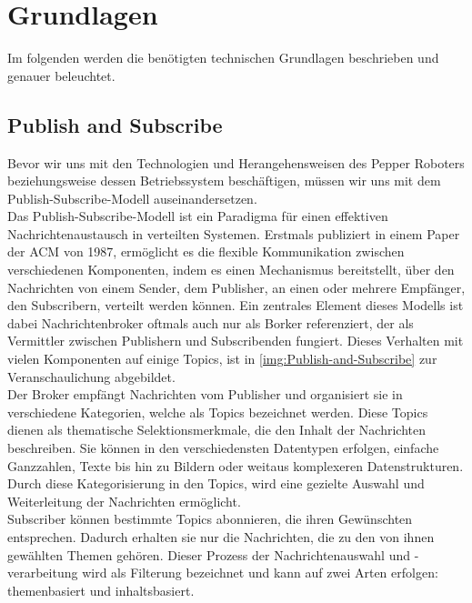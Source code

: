 \chapter{Grundlagen}\label{chap:Grundlagen}
Im folgenden werden die benötigten technischen Grundlagen beschrieben und genauer beleuchtet.

\section{Publish and Subscribe}\label{sec:PublishAndSubscribe}
Bevor wir uns mit den Technologien und Herangehensweisen des Pepper Roboters beziehungsweise dessen Betriebssystem beschäftigen, müssen wir uns mit dem Publish-Subscribe-Modell auseinandersetzen.
\\

\noindent
Das Publish-Subscribe-Modell ist ein Paradigma für einen effektiven Nachrichtenaustausch in verteilten Systemen. Erstmals publiziert in einem Paper der \ac{ACM} von 1987\cite{wiki_publish_subscribe_pattern}, ermöglicht es die flexible Kommunikation zwischen verschiedenen Komponenten, indem es einen Mechanismus bereitstellt, über den Nachrichten von einem Sender, dem Publisher, an einen oder mehrere Empfänger, den Subscribern, verteilt werden können. Ein zentrales Element dieses Modells ist dabei Nachrichtenbroker oftmals auch nur als Borker referenziert, der als Vermittler zwischen Publishern und Subscribenden fungiert. Dieses Verhalten mit vielen Komponenten auf einige Topics, ist in \autoref{img:Publish-and-Subscribe} zur Veranschaulichung abgebildet.\\
\noindent
Der Broker empfängt Nachrichten vom Publisher und organisiert sie in verschiedene Kategorien, welche als Topics bezeichnet werden. Diese Topics dienen als thematische Selektionsmerkmale, die den Inhalt der Nachrichten beschreiben. Sie können in den verschiedensten Datentypen erfolgen, einfache Ganzzahlen, Texte bis hin zu Bildern oder weitaus komplexeren Datenstrukturen. Durch diese Kategorisierung in den Topics, wird eine gezielte Auswahl und Weiterleitung der Nachrichten ermöglicht.
\\

\noindent
Subscriber können bestimmte Topics abonnieren, die ihren Gewünschten entsprechen. Dadurch erhalten sie nur die Nachrichten, die zu den von ihnen gewählten Themen gehören. Dieser Prozess der Nachrichtenauswahl und -verarbeitung wird als Filterung bezeichnet und kann auf zwei Arten erfolgen: themenbasiert und inhaltsbasiert.
\\

